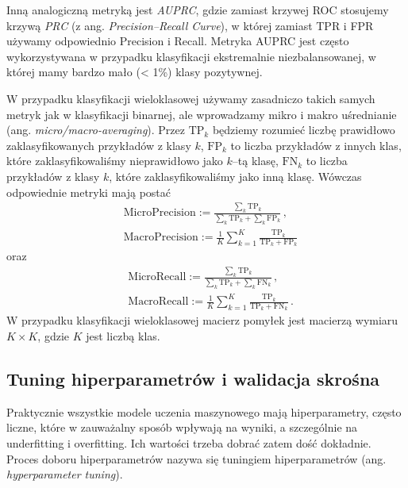 \documentclass{myclass}
\begin{document}
Inną analogiczną metryką jest \emph{AUPRC}, gdzie zamiast krzywej ROC stosujemy krzywą \emph{PRC} (z
ang. \emph{Precision--Recall Curve}), w której zamiast TPR i FPR używamy odpowiednio Precision i
Recall. Metryka AUPRC jest często wykorzystywana w przypadku klasyfikacji ekstremalnie
niezbalansowanej, w której mamy bardzo mało (< 1\%) klasy pozytywnej.

W przypadku klasyfikacji wieloklasowej używamy zasadniczo takich samych metryk jak w klasyfikacji
binarnej, ale wprowadzamy mikro i makro uśrednianie (ang. \emph{micro/macro-averaging}). Przez
\(\mathrm{TP}_k\) będziemy rozumieć liczbę prawidłowo zaklasyfikowanych przykładów z klasy \(k\),
\(\mathrm{FP}_k\) to liczba przykładów z innych klas, które zaklasyfikowaliśmy nieprawidłowo jako
\(k\)--tą klasę, \(\mathrm{FN}_k\) to liczba przykładów z klasy \(k\), które zaklasyfikowaliśmy jako
inną klasę. Wówczas odpowiednie metryki mają postać
\[
\begin{split}
&\mathrm{MicroPrecision} := \frac{\sum_{k} \mathrm{TP}_k}{\sum_{k} \mathrm{TP}_k + \sum_{k} \mathrm{FP}_k}\,,\\
&\mathrm{MacroPrecision} := \frac{1}{K} \sum_{k=1}^K \frac{\mathrm{TP}_k}{\mathrm{TP}_k + \mathrm{FP}_k}
\end{split}
\]
oraz
\[
\begin{split}
&\mathrm{MicroRecall} := \frac{\sum_{k} \mathrm{TP}_k}{\sum_{k} \mathrm{TP}_k + \sum_{k} \mathrm{FN}_k}\,,\\
&\mathrm{MacroRecall} := \frac{1}{K} \sum_{k=1}^K \frac{\mathrm{TP}_k}{\mathrm{TP}_k + \mathrm{FN}_k}\,.
\end{split}
\]
W przypadku klasyfikacji wieloklasowej macierz pomyłek jest macierzą wymiaru \(K \times K\), gdzie
\(K\) jest liczbą klas.


\subsection{Tuning hiperparametrów i walidacja skrośna}

Praktycznie wszystkie modele uczenia maszynowego mają hiperparametry, często liczne, które w
zauważalny sposób wpływają na wyniki, a szczególnie na underfitting i overfitting. Ich wartości
trzeba dobrać zatem dość dokładnie. Proces doboru hiperparametrów nazywa się tuningiem
hiperparametrów (ang. \emph{hyperparameter tuning}).
\end{document}
